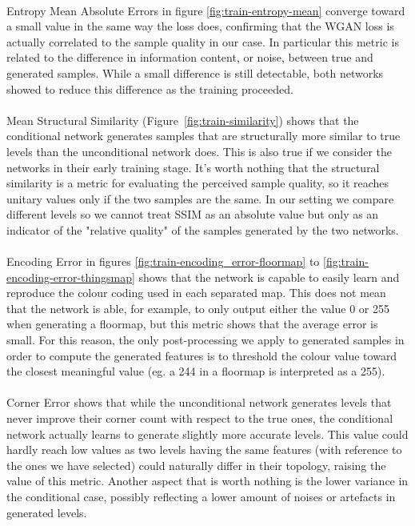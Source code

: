 \paragraph{} Entropy Mean Absolute Errors in figure \ref{fig:train-entropy-mean} converge toward a small value in the same way the loss does, confirming that the WGAN loss is actually correlated to the sample quality in our case. In particular this metric is related to the difference in information content, or noise, between true and generated samples. While a small difference is still detectable, both networks showed to reduce this difference as the training proceeded.

\paragraph{} Mean Structural Similarity (Figure~\ref{fig:train-similarity}) shows that the conditional network generates samples that are structurally more similar to true levels than the unconditional network does. This is also true if we consider the networks in their early training stage. It's worth nothing that the structural similarity is a metric for evaluating the perceived sample quality, so it reaches unitary values only if the two samples are the same. In our setting we compare different levels so we cannot treat SSIM as an absolute value but only as an indicator of the "relative quality" of the samples generated by the two networks.

\paragraph{} Encoding Error in figures \ref{fig:train-encoding_error-floormap} to \ref{fig:train-encoding-error-thingsmap} shows that the network is capable to easily learn and reproduce the colour coding used in each separated map. This does not mean that the network is able, for example, to only output either the value 0 or 255 when generating a floormap, but this metric shows that the average error is small. For this reason, the only post-processing we apply to generated samples in order to compute the generated features is to threshold the colour value toward the closest meaningful value (eg. a 244 in a floormap is interpreted as a 255). 

\paragraph{} Corner Error shows that while the unconditional network generates levels that never improve their corner count with respect to the true ones, the conditional network actually learns to generate slightly more accurate levels. This value could hardly reach low values as two levels having the same features (with reference to the ones we have selected) could naturally differ in their topology, raising the value of this metric. Another aspect that is worth nothing is the lower variance in the conditional case, possibly reflecting a lower amount of noises or artefacts in generated levels.

